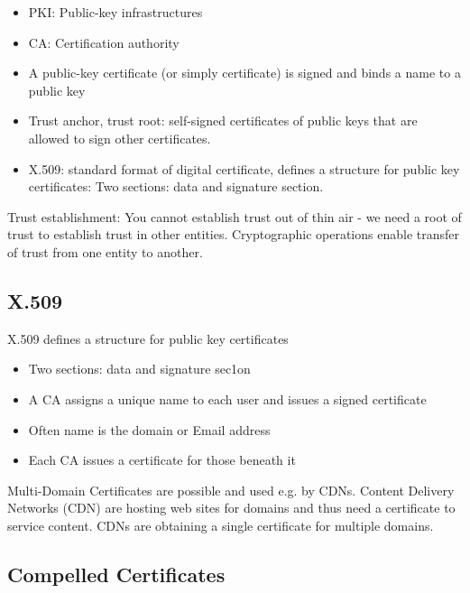 \documentclass[11pt,oneside,a4paper]{article}
\begin{document}
\vspace{-\topsep}
\begin{itemize}
	\setlength{\itemsep}{0pt}
	\setlength{\parskip}{0pt}
	\item PKI: Public-key infrastructures
	\item CA: Certification authority
	\item A public-key certificate (or simply certificate) is signed and binds a name to a public key \item Trust anchor, trust root: self-signed certificates of public keys that are allowed to sign other certificates.
	\item X.509: standard format of digital certificate, defines a structure for public key certificates: Two sections: data and signature section.
\end{itemize}
\vspace{-\topsep}

\noindent Trust establishment: You cannot establish trust out of thin air - we need a root of trust to establish trust in other entities. Cryptographic operations enable transfer of trust from one entity to another.

\subsection{X.509}

X.509 defines a structure for public key certificates

\vspace{-\topsep}
\begin{itemize}
	\setlength{\itemsep}{0pt}
	\setlength{\parskip}{0pt}
	\item Two sections: data and signature sec1on
	\item A CA assigns a unique name to each user and issues a signed certificate
	\item Often name is the domain or Email address
	\item Each CA issues a certificate for those beneath it
\end{itemize}
\vspace{-\topsep}

\noindent Multi-Domain Certificates are possible and used e.g. by CDNs. Content Delivery Networks (CDN) are hosting web sites for domains and thus need a certificate to service content. CDNs are obtaining a single certificate for multiple domains.

\subsection{Compelled Certificates}
\end{document}
